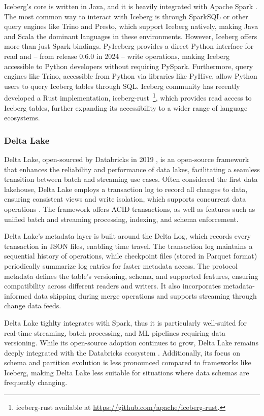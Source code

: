 Iceberg's core is written in Java, and it is heavily integrated with Apache Spark \cite{IcebergNewHadoop,iceberg_tech_docs}.  The most common way to interact with Iceberg is through SparkSQL or other query engines like Trino and Presto, which support Iceberg natively, making Java and Scala the dominant languages in these environments.  However, Iceberg offers more than just Spark bindings. PyIceberg \cite{PyIceberg} provides a direct Python interface for read and -- from release 0.6.0 in 2024 -- write operations, making Iceberg accessible to Python developers without requiring PySpark.  Furthermore, query engines like Trino, accessible from Python via libraries like PyHive, allow Python users to query Iceberg tables through SQL. Iceberg community has recently developed a Rust implementation, iceberg-rust~\footnote{iceberg-rust available at \url{https://github.com/apache/iceberg-rust}.}, which provides read access to Iceberg tables, further expanding its accessibility to a wider range of language ecosystems.



\subsubsection*{Delta Lake}
Delta Lake, open-sourced by Databricks in 2019 \cite{armbrustDeltaLakeHighperformance2020}, is an open-source framework that enhances the reliability and performance of data lakes, facilitating a seamless transition between batch and streaming use cases. Often considered the first data lakehouse, Delta Lake employs a transaction log to record all changes to data, ensuring consistent views and write isolation, which supports concurrent data operations \cite{deltalake_tech_docs}. The framework offers \gls{ACID} transactions, as well as features such as unified batch and streaming processing, indexing, and schema enforcement.

Delta Lake's metadata layer is built around the Delta Log, which records every transaction in JSON files, enabling time travel. The transaction log maintains a sequential history of operations, while checkpoint files (stored in Parquet format) periodically summarize log entries for faster metadata access. The protocol metadata defines the table's versioning, schema, and supported features, ensuring compatibility across different readers and writers. It also incorporates metadata-informed data skipping during merge operations and supports streaming through change data feeds.

Delta Lake tighlty integrates with Spark, thus it is particularly well-suited for real-time streaming, batch processing, and \gls{ML} pipelines requiring data versioning. While its open-source adoption continues to grow, Delta Lake remains deeply integrated with the Databricks ecosystem \cite{jainAnalyzingComparingLakehouse2023,comparison2_medium_recent}. Additionally, its focus on schema and partition evolution is less pronounced compared to frameworks like Iceberg, making Delta Lake less suitable for situations where data schemas are frequently changing.

